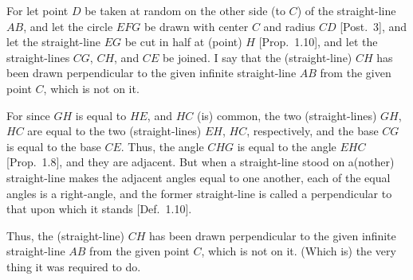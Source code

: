 \begin{Parallel}{}{}
{For let point $D$ be taken at random on the other side (to $C$) of 
the straight-line $AB$, and let the circle $EFG$ be drawn
with center $C$ and radius $CD$ [Post.~3], and let the straight-line $EG$ be cut
in half at (point) $H$ [Prop.~1.10], and let the straight-lines $CG$, $CH$,
and $CE$ be joined. I say that the  (straight-line) $CH$ has
been drawn  perpendicular to the given infinite straight-line
$AB$ from the given point $C$, which is not on it.

For since $GH$ is equal to $HE$, and $HC$ (is) common, the two (straight-lines) $GH$, 
$HC$
are equal to the two (straight-lines) $EH$, $HC$, respectively, and the base $CG$ is
equal to the base $CE$. Thus, the angle $CHG$ is equal to the
angle $EHC$ [Prop.~1.8], and they are adjacent. But when a straight-line
stood on a(nother) straight-line makes the adjacent angles equal to one another, each of the equal angles is a right-angle, and the former straight-line is called a perpendicular to that upon which it stands [Def.~1.10].

Thus, the (straight-line) $CH$ has been drawn perpendicular to the given infinite straight-line $AB$ from the given point $C$, which is not
on  it. (Which is) the very thing it was required to do.}
\end{Parallel}

